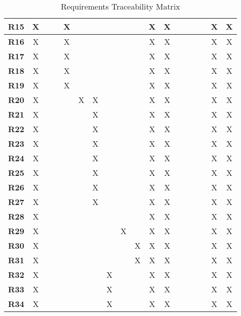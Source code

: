 \begin{table}[H]
\begin{tabular}{|c|c|c|c|c|c|c|c|c|c|c|c|c|c|c|c|c|c|}
        \textbf{R15} & X &   &   & X &   &   &   &   &   & X & X &   &   &   &   & X & X \\ \hline
        \textbf{R16} & X &   &   & X &   &   &   &   &   & X & X &   &   &   &   & X & X \\ \hline
        \textbf{R17} & X &   &   & X &   &   &   &   &   & X & X &   &   &   &   & X & X \\ \hline
        \textbf{R18} & X &   &   & X &   &   &   &   &   & X & X &   &   &   &   & X & X \\ \hline
        \textbf{R19} & X &   &   & X &   &   &   &   &   & X & X &   &   &   &   & X & X \\ \hline
        \textbf{R20} & X &   &   &   & X & X &   &   &   & X & X &   &   &   &   & X & X \\ \hline
        \textbf{R21} & X &   &   &   &   & X &   &   &   & X & X &   &   &   &   & X & X \\ \hline
        \textbf{R22} & X &   &   &   &   & X &   &   &   & X & X &   &   &   &   & X & X \\ \hline
        \textbf{R23} & X &   &   &   &   & X &   &   &   & X & X &   &   &   &   & X & X \\ \hline
        \textbf{R24} & X &   &   &   &   & X &   &   &   & X & X &   &   &   &   & X & X \\ \hline
        \textbf{R25} & X &   &   &   &   & X &   &   &   & X & X &   &   &   &   & X & X \\ \hline
        \textbf{R26} & X &   &   &   &   & X &   &   &   & X & X &   &   &   &   & X & X \\ \hline
        \textbf{R27} & X &   &   &   &   & X &   &   &   & X & X &   &   &   &   & X & X \\ \hline
        \textbf{R28} & X &   &   &   &   &   &   &   &   & X & X &   &   &   &   & X & X \\ \hline
        \textbf{R29} & X &   &   &   &   &   &   & X &   & X & X &   &   &   &   & X & X \\ \hline
        \textbf{R30} & X &   &   &   &   &   &   &   & X & X & X &   &   &   &   & X & X \\ \hline
        \textbf{R31} & X &   &   &   &   &   &   &   & X & X & X &   &   &   &   & X & X \\ \hline
        \textbf{R32} & X &   &   &   &   &   & X &   &   & X & X &   &   &   &   & X & X \\ \hline
        \textbf{R33} & X &   &   &   &   &   & X &   &   & X & X &   &   &   &   & X & X \\ \hline
        \textbf{R34} & X &   &   &   &   &   & X &   &   & X & X &   &   &   &   & X & X \\ \hline
    \end{tabular}
    \caption{Requirements Traceability Matrix}
    \label{tab:requirements_traceability}
\end{table}